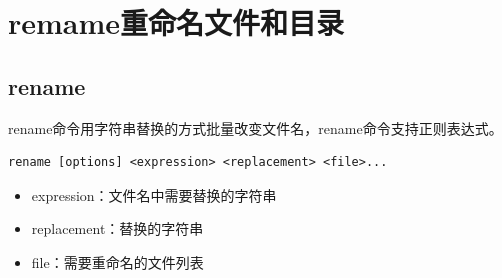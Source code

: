 \documentclass[12pt, openany, oneside]{book}
\begin{document}
\begin{table}[H]
    \centering
    \caption{mv参数说明}
\end{table}

\newpage

\section{remame重命名文件和目录}

\subsection{rename}

rename命令用字符串替换的方式批量改变文件名，rename命令支持正则表达式。

\vspace{-0.5cm}

\begin{lstlisting}
rename [options] <expression> <replacement> <file>...
\end{lstlisting}

\begin{itemize}
    \item expression：文件名中需要替换的字符串

    \item replacement：替换的字符串

    \item file：需要重命名的文件列表
\end{itemize}
\end{document}
